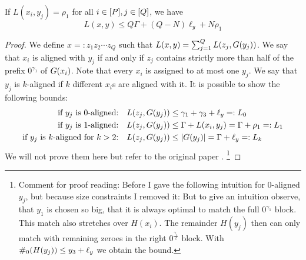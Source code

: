 \begin{lemma}
\label{lem:1-2vs1:non-ortho-upper-bound}
If $L(x_i, y_j) = \rho_1$ for all $i \in [P], j \in [Q]$, we have
\[ 
L(x,y) \leq Q\Gamma + (Q-N)\ell_y + N\rho_1
\]
\end{lemma}


\begin{proof}
%
We define $x =: z_1z_2 \cdots z_Q$ such that $L(x,y) = \sum_{j=1}^Q L(z_j, G(y_j))$.
We say that $x_i$ is aligned with $y_j$ if and only if $z_j$ contains strictly more than half of the prefix $0^{\gamma_1}$ of $G(x_i)$.
Note that every $x_i$ is assigned to at most one $y_j$.
We say that $y_j$ is $k$-aligned if $k$ different $x_i$s are aligned with it.
%
It is possible to show the following bounds:
\begin{align*}
	\text{if $y_j$ is $0$-aligned:}&& L(z_j, G(y_j)) &\leq \gamma_1 + \gamma_3 + \ell_y =: L_0 \\
	\text{if $y_j$ is $1$-aligned:}&& L(z_j, G(y_j)) &\leq \Gamma + L(x_i, y_j) = \Gamma + \rho_1 =: L_1 \\
	\text{if $y_j$ is $k$-aligned for $k>2$:}&& L(z_j, G(y_j)) &\leq |G(y_j)| = \Gamma + \ell_y =: L_k
\end{align*}
We will not prove them here but refer to the original paper \cite[Lemma 9.6\footnote{Lemma 9.6 combines this and the following lemma in this summary. The proof of the claim is in the proof for the second inequality of Lemma 9.6.}]{Bringman.2018}.
\footnote{Comment for proof reading: Before I gave the following intuition for $0$-aligned $y_j$, but because size constraints I removed it:
But to give an intuition observe, that $y_1$ is chosen so big, that it is always optimal to match the full $0^{\gamma_1}$ block.
This match also stretches over $H(x_i)$.
The remainder $H(y_j)$ then can only match with remaining zeroes in the right $0^{\frac{\gamma_1}{2}}$ block.
With $\#_{0}(H(y_j)) \leq y_3 + \ell_y$ we obtain the bound.}



\end{proof}
